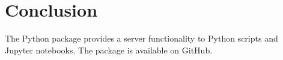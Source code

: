 

\chapter{Conclusion}
\label{chap:Conclusion}

The \libraddask{} Python package provides a \libradtran{} server functionality to Python scripts and Jupyter notebooks.  The package is available on GitHub.

 
